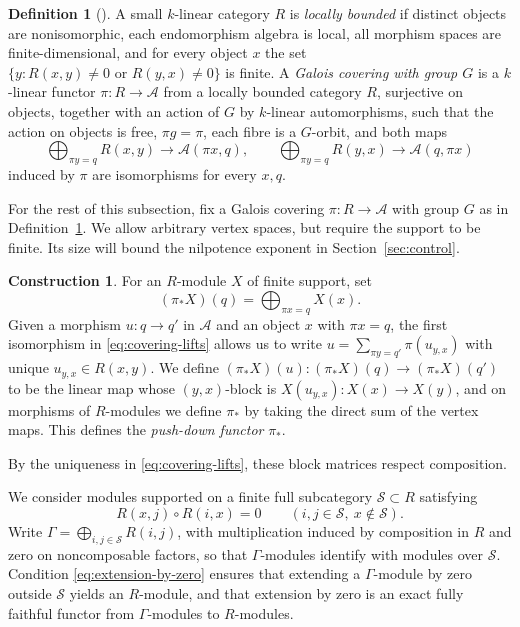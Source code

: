 \documentclass[a4paper,reqno,10pt]{amsart}
\theoremstyle{definition}
\newtheorem{definition}[theorem]{Definition}
\newtheorem{construction}[theorem]{Construction}
\numberwithin{equation}{section}
\begin{document}
\begin{definition}[{\cite[3.1]{GabrielUniversal}}]\label{def:covering}
A small $k$-linear category $R$ is \emph{locally bounded} if distinct
objects are nonisomorphic, each endomorphism algebra is local, all
morphism spaces are finite-dimensional, and for every object $x$ the set
$\{y:R(x,y)\ne0\text{ or }R(y,x)\ne0\}$ is finite.
A \emph{Galois covering with group $G$} is a $k$-linear functor
$\pi:R\to\mathcal A$ from a locally bounded category $R$, surjective on
objects, together with an action
of $G$ by $k$-linear automorphisms, such that the action on objects is
free, $\pi g=\pi$, each fibre is a $G$-orbit, and both maps
\begin{equation}\label{eq:covering-lifts}
 \bigoplus_{\pi y=q}R(x,y)\longrightarrow\mathcal A(\pi x,q),
 \qquad
 \bigoplus_{\pi y=q}R(y,x)\longrightarrow\mathcal A(q,\pi x)
\end{equation}
induced by $\pi$ are isomorphisms for every $x,q$.
\end{definition}

For the rest of this subsection, fix a Galois covering
$\pi:R\to\mathcal A$ with group $G$ as in Definition~\ref{def:covering}.
We allow arbitrary vertex spaces, but require the support to be finite.
Its size will bound the nilpotence exponent in Section~\ref{sec:control}.
\begin{construction}\label{con:pushdown}
For an $R$-module $X$ of finite support, set
\[
 (\pi_*X)(q)=\bigoplus_{\pi x=q}X(x).
\]
Given a morphism $u:q\to q'$ in $\mathcal A$ and an object $x$ with
$\pi x=q$, the first isomorphism in \eqref{eq:covering-lifts} allows us to write
$u=\sum_{\pi y=q'}\pi(u_{y,x})$ with unique $u_{y,x}\in R(x,y)$. We define
$(\pi_*X)(u):(\pi_*X)(q)\to(\pi_*X)(q')$ to be the linear map whose $(y,x)$-block is $X(u_{y,x}):X(x)\to X(y)$, and on morphisms of $R$-modules we define $\pi_*$ by taking the direct sum of the
vertex maps. This defines the \emph{push-down functor} $\pi_*$.
\end{construction}
By the uniqueness in \eqref{eq:covering-lifts}, these block matrices
respect composition.

We consider modules supported on a finite full subcategory $\mathcal S\subset R$
satisfying
\begin{equation}\label{eq:extension-by-zero}
 R(x,j)\circ R(i,x)=0\qquad(i,j\in\mathcal S,\ x\notin\mathcal S).
\end{equation}
Write $\Gamma=\bigoplus_{i,j\in\mathcal S}R(i,j)$, with multiplication induced
by composition in $R$ and zero on noncomposable factors, so that $\Gamma$-modules identify with modules over $\mathcal S$. Condition
\eqref{eq:extension-by-zero} ensures that extending a $\Gamma$-module by
zero outside $\mathcal S$ yields an $R$-module, and that extension by zero is an exact fully faithful
functor from $\Gamma$-modules to $R$-modules.
\end{document}
